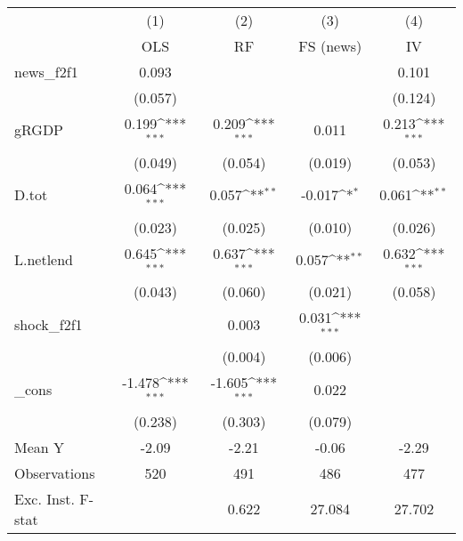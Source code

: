 {
\def\sym#1{\ifmmode^{#1}\else\(^{#1}\)\fi}
\begin{tabular}{l*{4}{c}}
\toprule
            &\multicolumn{1}{c}{(1)}&\multicolumn{1}{c}{(2)}&\multicolumn{1}{c}{(3)}&\multicolumn{1}{c}{(4)}\\
            &\multicolumn{1}{c}{OLS}&\multicolumn{1}{c}{RF}&\multicolumn{1}{c}{FS (news)}&\multicolumn{1}{c}{IV}\\
\midrule
news\_f2f1   &       0.093         &                     &                     &       0.101         \\
            &     (0.057)         &                     &                     &     (0.124)         \\
\addlinespace
gRGDP       &       0.199\sym{***}&       0.209\sym{***}&       0.011         &       0.213\sym{***}\\
            &     (0.049)         &     (0.054)         &     (0.019)         &     (0.053)         \\
\addlinespace
D.tot       &       0.064\sym{***}&       0.057\sym{**} &      -0.017\sym{*}  &       0.061\sym{**} \\
            &     (0.023)         &     (0.025)         &     (0.010)         &     (0.026)         \\
\addlinespace
L.netlend   &       0.645\sym{***}&       0.637\sym{***}&       0.057\sym{**} &       0.632\sym{***}\\
            &     (0.043)         &     (0.060)         &     (0.021)         &     (0.058)         \\
\addlinespace
shock\_f2f1  &                     &       0.003         &       0.031\sym{***}&                     \\
            &                     &     (0.004)         &     (0.006)         &                     \\
\addlinespace
\_cons      &      -1.478\sym{***}&      -1.605\sym{***}&       0.022         &                     \\
            &     (0.238)         &     (0.303)         &     (0.079)         &                     \\
\midrule
Mean Y      &       -2.09         &       -2.21         &       -0.06         &       -2.29         \\
Observations&         520         &         491         &         486         &         477         \\
Exc. Inst. F-stat&                     &       0.622         &      27.084         &      27.702         \\
\bottomrule
\end{tabular}
}
